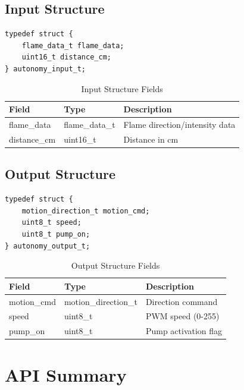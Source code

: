 \documentclass[12pt,a4paper]{article}
\begin{document}
\subsection{Input Structure}

\begin{lstlisting}[caption={autonomy_input_t}]
typedef struct {
    flame_data_t flame_data;
    uint16_t distance_cm;
} autonomy_input_t;
\end{lstlisting}

\begin{table}[H]
\centering
\begin{tabularx}{\linewidth}{llX}
\toprule
Field & Type & Description \\
\midrule
flame\_data & flame\_data\_t & Flame direction/intensity data \\
distance\_cm & uint16\_t & Distance in cm \\
\bottomrule
\end{tabularx}
\caption{Input Structure Fields}
\end{table}

\subsection{Output Structure}

\begin{lstlisting}[caption={autonomy_output_t}]
typedef struct {
    motion_direction_t motion_cmd;
    uint8_t speed;
    uint8_t pump_on;
} autonomy_output_t;
\end{lstlisting}

\begin{table}[H]
\centering
\begin{tabularx}{\linewidth}{llX}
\toprule
Field & Type & Description \\
\midrule
motion\_cmd & motion\_direction\_t & Direction command \\
speed & uint8\_t & PWM speed (0-255) \\
pump\_on & uint8\_t & Pump activation flag \\
\bottomrule
\end{tabularx}
\caption{Output Structure Fields}
\end{table}

\FloatBarrier
\section{API Summary}
\end{document}
